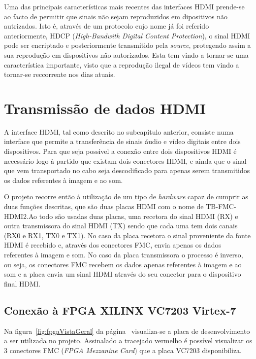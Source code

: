 Uma das principais características mais recentes das interfaces HDMI prende-se ao facto de permitir que sinais não sejam reproduzidos em dipositivos não autrizados. Isto é, através de um protocolo cujo nome já foi referido anteriormente, HDCP (\textit{High-Bandwith Digital Content Protection}), o sinal HDMI pode ser encriptado e posteriormente transmitido pela \textit{source}, protegendo assim a sua reprodução em dispositivos não autorizados. Esta tem vindo a tornar-se uma característica importante, visto que a reprodução ilegal de vídeos tem vindo a tornar-se reccorrente nos dias atuais.

\section{Transmissão de dados HDMI}\label{sec:HDMIinFPGA}
A interface HDMI, tal como descrito no subcapítulo anterior, consiste numa interface que permite a transferência de sinais áudio e vídeo digitais entre dois dispositivos. Para que seja possivel a conexão entre dois dispositivos HDMI é necessário logo à partido que existam dois conectores HDMI, e ainda que o sinal que vem transportado no cabo seja descodificado para apenas serem transmitidos os dados referentes à imagem e ao som.   

O projeto recorre então à utilização de um tipo de \textit{hardware} capaz de cumprir as duas funções descritas, que são duas placas HDMI com o nome de TB-FMC-HDMI2.Ao todo são usadas duas placas, uma recetora do sinal HDMI (RX) e outra transmissora do sinal HDMI (TX) sendo que cada uma tem dois canais (RX0 e RX1, TX0 e TX1). No caso da placa recetora o sinal proveniente da fonte HDMI é recebido e, através dos conectores FMC, envia apenas os dados referentes à imagem e som. No caso da placa transmissora o processo é inverso, ou seja, os conectores FMC recebem os dados apenas referentes à imagem e ao som e a placa envia um sinal HDMI através do seu conector para o dispositivo final HDMI.

\subsection{Conexão à FPGA XILINX VC7203 Virtex-7} \label{subsec:HDMIconexao} 
Na figura~\ref{fig:fpgaVistaGeral} da página~\pageref{fig:fpgaVistaGeral}  visualiza-se a placa de desenvolvimento a ser utilizada no projeto. Assinalado a tracejado vermelho é possível visualizar os 3 conectores FMC (\textit{FPGA Mezzanine Card}) que a placa VC7203 disponibiliza.

